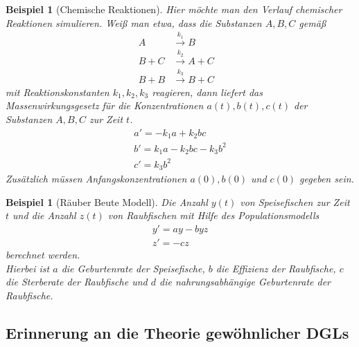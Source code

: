 \documentclass[12pt]{article}
\theoremstyle{break}
\newtheorem{example}[theorem]{Beispiel}
\begin{document}
\begin{example}[Chemische Reaktionen]
Hier möchte man den Verlauf chemischer Reaktionen simulieren. Weiß man etwa, dass die Substanzen $A, B, C$ gemäß
\begin{align*}
A &\overset{k_1}{\rightarrow} B &\\
B + C &\overset{k_2}{\rightarrow} A + C &\\
B + B &\overset{k_3}{\rightarrow} B + C
\end{align*}
mit Reaktionskonstanten $k_1, k_2, k_3$ reagieren, dann liefert das Massenwirkungsgesetz für die Konzentrationen $a(t), b(t), c(t)$ der Substanzen $A, B, C$ zur Zeit $t$.
\begin{align*}
&a' = -k_1a + k_2 bc &\\
&b' = k_1a - k_2 bc - k_3 b^2 &\\
&c' = k_3b^2
\end{align*}
Zusätzlich müssen Anfangskonzentrationen $a(0), b(0)$ und $c(0)$ gegeben sein.
\end{example}

\begin{example}[Räuber Beute Modell]
Die Anzahl $y(t)$ von Speisefischen zur Zeit $t$ und die Anzahl $z(t)$ von Raubfischen mit Hilfe des Populationsmodells
\begin{align*}
&y' = ay - byz &\\
&z' = -cz
\end{align*}
berechnet werden.\\
Hierbei ist $a$ die Geburtenrate der Speisefische, $b$ die Effizienz der Raubfische, $c$ die Sterberate der Raubfische und $d$ die nahrungsabhängige Geburtenrate der Raubfische.
\end{example}

\subsection{Erinnerung an die Theorie gewöhnlicher DGLs}
\end{document}
